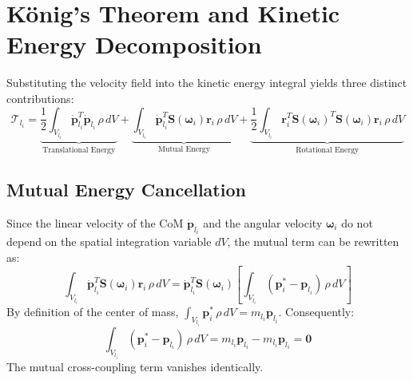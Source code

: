 \documentclass[11pt, a4paper]{article}
\begin{document}
\section{König's Theorem and Kinetic Energy Decomposition}
Substituting the velocity field into the kinetic energy integral yields three distinct contributions:
\begin{equation}
\label{eq:konig_proof}
    \mathcal{T}_{l_i} = \underbrace{\frac{1}{2} \int_{V_{l_i}} \mathbf{\dot{p}}_{l_i}^T \mathbf{\dot{p}}_{l_i} \, \rho \, dV}_{\text{Translational Energy}} + \underbrace{\int_{V_{l_i}} \mathbf{\dot{p}}_{l_i}^T \mathbf{S}(\boldsymbol{\omega}_i)\mathbf{r}_i \, \rho \, dV}_{\text{Mutual Energy}} + \underbrace{\frac{1}{2} \int_{V_{l_i}} \mathbf{r}_i^T \mathbf{S}(\boldsymbol{\omega}_i)^T \mathbf{S}(\boldsymbol{\omega}_i)\mathbf{r}_i \, \rho \, dV}_{\text{Rotational Energy}}
\end{equation}

\subsection{Mutual Energy Cancellation}
Since the linear velocity of the CoM $\mathbf{\dot{p}}_{l_i}$ and the angular velocity $\boldsymbol{\omega}_i$ do not depend on the spatial integration variable $dV$, the mutual term can be rewritten as:
\begin{equation}
    \int_{V_{l_i}} \mathbf{\dot{p}}_{l_i}^T \mathbf{S}(\boldsymbol{\omega}_i)\mathbf{r}_i \, \rho \, dV = \mathbf{\dot{p}}_{l_i}^T \mathbf{S}(\boldsymbol{\omega}_i) \left[ \int_{V_{l_i}} (\mathbf{p}_i^* - \mathbf{p}_{l_i}) \, \rho \, dV \right]
\end{equation}
By definition of the center of mass, $\int_{V_{l_i}} \mathbf{p}_i^* \, \rho \, dV = m_{l_i} \mathbf{p}_{l_i}$. Consequently:
\begin{equation}
    \int_{V_{l_i}} (\mathbf{p}_i^* - \mathbf{p}_{l_i}) \, \rho \, dV = m_{l_i}\mathbf{p}_{l_i} - m_{l_i}\mathbf{p}_{l_i} = \mathbf{0}
\end{equation}
The mutual cross-coupling term vanishes identically.
\end{document}
